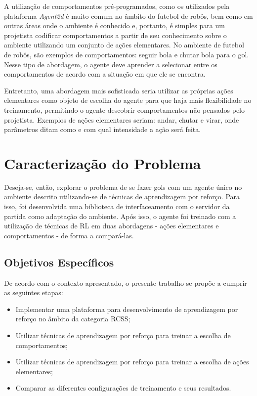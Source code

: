 A utilização de comportamentos pré-programados, como os utilizados pela plataforma \textit{Agent2d} é muito comum no âmbito do futebol de robôs, bem como em outras áreas onde o ambiente é conhecido e, portanto, é simples para um projetista codificar comportamentos a partir de seu conhecimento sobre o ambiente utilizando um conjunto de ações elementares. No ambiente de futebol de robôs, são exemplos de comportamentos: seguir bola e chutar bola para o gol. Nesse tipo de abordagem, o agente deve aprender a selecionar entre os comportamentos de acordo com a situação em que ele se encontra.

Entretanto, uma abordagem mais sofisticada seria utilizar as próprias ações elementares como objeto de escolha do agente para que haja mais flexibilidade no treinamento, permitindo o agente descobrir comportamentos não pensados pelo projetista. Exemplos de ações elementares seriam: andar, chutar e virar, onde parâmetros ditam como e com qual intensidade a ação será feita.


\section{Caracterização do Problema}

Deseja-se, então, explorar o problema de se fazer gols com um agente único no ambiente descrito utilizando-se de técnicas de aprendizagem por reforço. Para isso, foi desenvolvida uma biblioteca de interfaceamento com o servidor da partida como adaptação do ambiente. Após isso, o agente foi treinado com a utilização de técnicas de RL em duas abordagens - ações elementares e comportamentos - de forma a compará-las.


\subsection{Objetivos Específicos}
\par De acordo com o contexto apresentado, o presente trabalho se propõe a cumprir as seguintes etapas:
\begin{itemize}
	\item Implementar uma plataforma para desenvolvimento de aprendizagem por reforço no âmbito da categoria RCSS;
	\item Utilizar técnicas de aprendizagem por reforço para treinar a escolha de comportamentos;
	\item Utilizar técnicas de aprendizagem por reforço para treinar a escolha de ações elementares;
	\item Comparar as diferentes configurações de treinamento e seus resultados.
\end{itemize}

